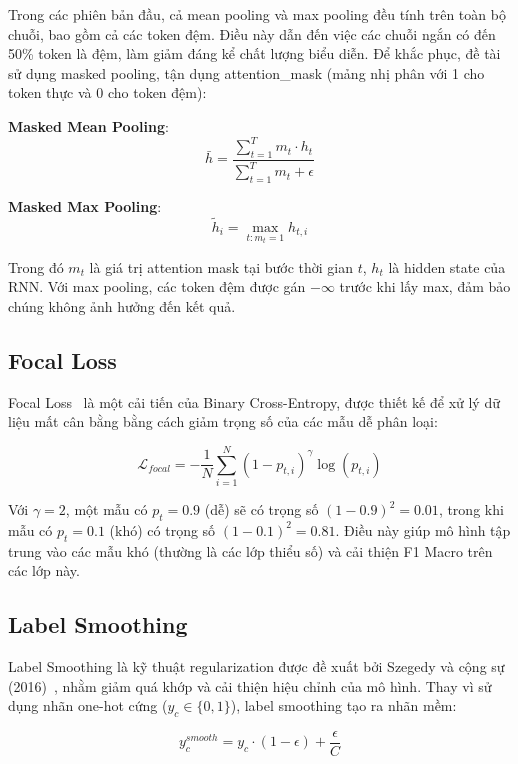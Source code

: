 \documentclass[../BTL.tex]{subfiles}
\begin{document}
Trong các phiên bản đầu, cả mean pooling và max pooling đều tính trên toàn bộ chuỗi, bao gồm cả các token đệm. Điều này dẫn đến việc các chuỗi ngắn có đến 50\% token là đệm, làm giảm đáng kể chất lượng biểu diễn. Để khắc phục, đề tài sử dụng masked pooling, tận dụng attention\_mask (mảng nhị phân với 1 cho token thực và 0 cho token đệm):

\textbf{Masked Mean Pooling}:
\begin{equation}
    \bar{h} = \frac{\sum_{t=1}^T m_t \cdot h_t}{\sum_{t=1}^T m_t + \epsilon}
\end{equation}

\textbf{Masked Max Pooling}:
\begin{equation}
    \tilde{h}_i = \max_{t: m_t = 1} h_{t,i}
\end{equation}

Trong đó $m_t$ là giá trị attention mask tại bước thời gian $t$, $h_t$ là hidden state của RNN. Với max pooling, các token đệm được gán $-\infty$ trước khi lấy max, đảm bảo chúng không ảnh hưởng đến kết quả.

\subsection{Focal Loss}
Focal Loss~\cite{lin2017focal} là một cải tiến của Binary Cross-Entropy, được thiết kế để xử lý dữ liệu mất cân bằng bằng cách giảm trọng số của các mẫu dễ phân loại:

\begin{equation}
    \mathcal{L}_{focal} = -\frac{1}{N}\sum_{i=1}^N (1-p_{t,i})^\gamma \log(p_{t,i})
\end{equation}

Với $\gamma = 2$, một mẫu có $p_t = 0.9$ (dễ) sẽ có trọng số $(1-0.9)^2 = 0.01$, trong khi mẫu có $p_t = 0.1$ (khó) có trọng số $(1-0.1)^2 = 0.81$. Điều này giúp mô hình tập trung vào các mẫu khó (thường là các lớp thiểu số) và cải thiện F1 Macro trên các lớp này.

\subsection{Label Smoothing}
Label Smoothing là kỹ thuật regularization được đề xuất bởi Szegedy và cộng sự (2016)~\cite{szegedy2016rethinking}, nhằm giảm quá khớp và cải thiện hiệu chỉnh của mô hình. Thay vì sử dụng nhãn one-hot cứng ($y_c \in \{0, 1\}$), label smoothing tạo ra nhãn mềm:

\begin{equation}
    y_c^{smooth} = y_c \cdot (1 - \epsilon) + \frac{\epsilon}{C}
\end{equation}
\end{document}
